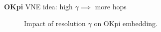 \documentclass[aspectratio=169]{beamer}
\begin{document}
\begin{frame}
    \frametitle{\secname}
    \framesubtitle{\subsecname}

    \textbf{OKpi} VNE idea: high $\gamma\implies$ more hops\pause
    \begin{figure}
        \hspace{1.5em}\vline\hspace{1.5em}
        \caption{Impact of resolution $\gamma$ on OKpi embedding.}
    \end{figure}
\end{frame}
\end{document}
